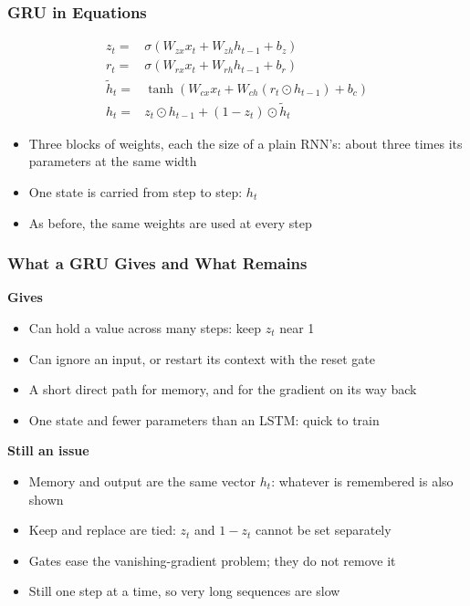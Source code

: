 \begin{frame}[fragile] \frametitle{GRU in Equations}
\begin{align*}
z_t =& \sigma(W_{zx} x_t + W_{zh} h_{t-1} + b_z) \\
r_t =& \sigma(W_{rx} x_t + W_{rh} h_{t-1} + b_r) \\
\tilde{h}_t =& \tanh(W_{cx} x_t + W_{ch} (r_t \odot h_{t-1}) + b_c) \\
h_t =& z_t \odot h_{t-1} + (1 - z_t) \odot \tilde{h}_t
\end{align*}
\begin{itemize}
\item Three blocks of weights, each the size of a plain RNN's: about three times its parameters at the same width
\item One state is carried from step to step: $h_t$
\item As before, the same weights are used at every step
\end{itemize}
\end{frame}


\begin{frame}[fragile] \frametitle{What a GRU Gives and What Remains}
\textbf{Gives}
\begin{itemize}
\item Can hold a value across many steps: keep $z_t$ near 1
\item Can ignore an input, or restart its context with the reset gate
\item A short direct path for memory, and for the gradient on its way back
\item One state and fewer parameters than an LSTM: quick to train
\end{itemize}
\textbf{Still an issue}
\begin{itemize}
\item Memory and output are the same vector $h_t$: whatever is remembered is also shown
\item Keep and replace are tied: $z_t$ and $1 - z_t$ cannot be set separately
\item Gates ease the vanishing-gradient problem; they do not remove it
\item Still one step at a time, so very long sequences are slow
\end{itemize}
\end{frame}
